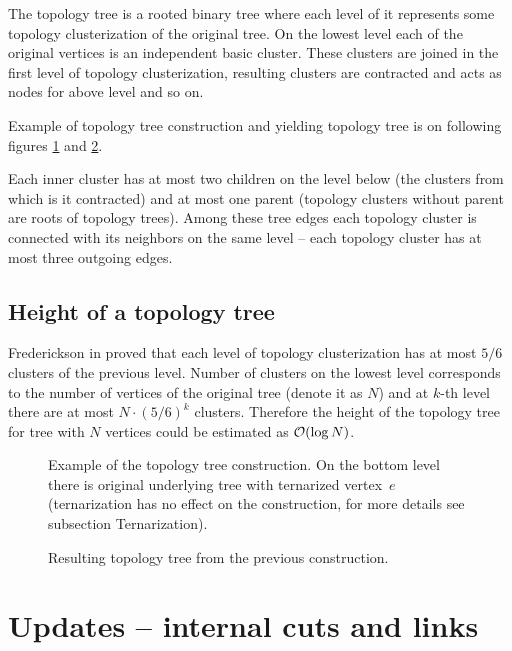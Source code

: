 The {\I topology tree} is a rooted binary tree where each
level of it represents some topology clusterization of the original tree. On the
lowest level each of the original vertices is an independent basic cluster.
These clusters are joined in the first level of topology clusterization,
resulting clusters are contracted and acts as nodes for above level and so on.

Example of topology tree construction and yielding topology tree is on following
figures \ref{fig:topology_tree_construction} and \ref{fig:topology_tree_example}.

Each inner cluster has at most two children on the level below (the clusters
from which is it contracted) and at most one parent (topology clusters without
parent are roots of topology trees). Among these tree edges each topology
cluster is connected with its neighbors on the same level -- each topology
cluster has at most three outgoing edges.

\subsection{Height of a topology tree}

Frederickson in \cite{DSforDynamicallyMaintainingRootedTrees} proved that each
level of topology clusterization has at most $5/6$ clusters of the previous
level. Number of clusters on the lowest level corresponds to the number of
vertices of the original tree (denote it as $N$) and at $k$-th level there are
at most $N\cdot(5/6)^k$ clusters. Therefore the height of the topology tree for
tree with $N$ vertices could be estimated as ${\cal O}(\log N)$.

\begin{figure}[H]
\centering
{}
\caption[Example of the topology tree construction]
{Example of the topology tree construction. On the bottom level there is
original underlying tree with ternarized vertex $\,e$ (ternarization has no effect
on the construction, for more details see subsection Ternarization).}
\label{fig:topology_tree_construction}
\end{figure}

\begin{figure}[H]
\centering
{}
\caption{Resulting topology tree from the previous construction.}
\label{fig:topology_tree_example}
\end{figure}

\section{Updates -- internal cuts and links}

